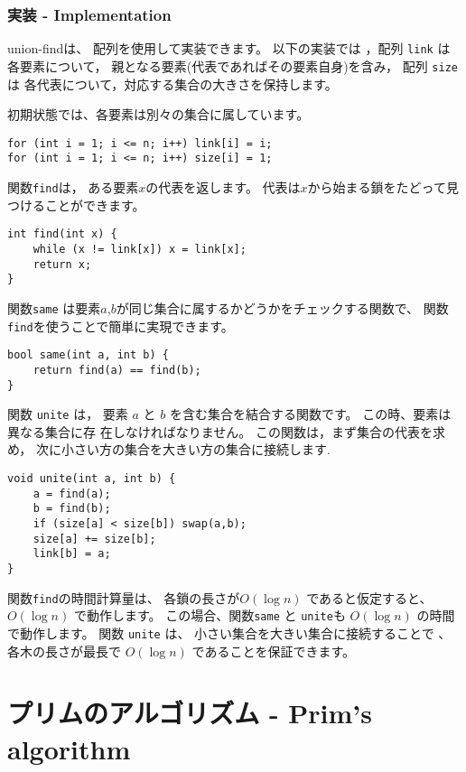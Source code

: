 \subsubsection{実装 - Implementation}

union-findは、
配列を使用して実装できます。
以下の実装では ，配列 \texttt{link} は各要素について，
親となる要素(代表であればその要素自身)を含み，
配列 \texttt{size} は
各代表について，対応する集合の大きさを保持します。

初期状態では、各要素は別々の集合に属しています。
\begin{lstlisting}
for (int i = 1; i <= n; i++) link[i] = i;
for (int i = 1; i <= n; i++) size[i] = 1;
\end{lstlisting}

関数\texttt{find}は，
ある要素$x$の代表を返します。
代表は$x$から始まる鎖をたどって見つけることができます。

\begin{lstlisting}
int find(int x) {
    while (x != link[x]) x = link[x];
    return x;
}
\end{lstlisting}

関数\texttt{same} は要素$a$,$b$が同じ集合に属するかどうかをチェックする関数で、
関数\texttt{find}を使うことで簡単に実現できます。

\begin{lstlisting}
bool same(int a, int b) {
    return find(a) == find(b);
}
\end{lstlisting}

\begin{samepage}
関数 \texttt{unite}  は，
要素 $a$ と $b$ を含む集合を結合する関数です。
この時、要素は異なる集合に存 在しなければなりません。
この関数は，まず集合の代表を求め，
次に小さい方の集合を大きい方の集合に接続します.

\begin{lstlisting}
void unite(int a, int b) {
    a = find(a);
    b = find(b);
    if (size[a] < size[b]) swap(a,b);
    size[a] += size[b];
    link[b] = a;
}
\end{lstlisting}
\end{samepage}

関数\texttt{find}の時間計算量は、
各鎖の長さが$O(\log n)$ であると仮定すると、
$O(\log n)$ で動作します。
この場合、関数\texttt{same} と \texttt{unite}も
$O(\log n)$ の時間で動作します。
関数 \texttt{unite} は、
小さい集合を大きい集合に接続することで
、各木の長さが最長で $O(\log n)$ であることを保証できます。

\section{プリムのアルゴリズム - Prim's algorithm}

